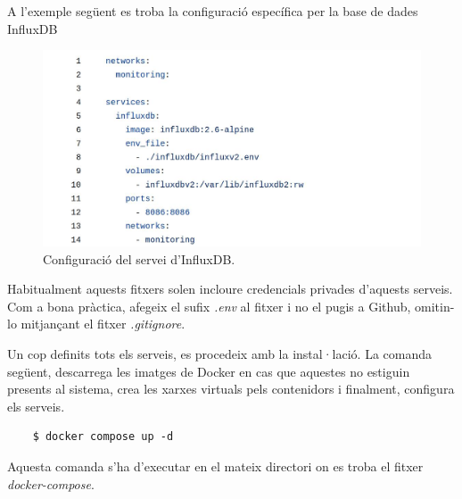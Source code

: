 \clearpage

\noindent
A l'exemple següent es troba la configuració específica per la base de dades InfluxDB

\begin{figure}[htbp]
    \centerline{\includegraphics[width=\textwidth]{figures/docker-compose-influxdb}}
    \captionsetup{justification=centering}
    \caption{Configuració del servei d'InfluxDB.}\label{fig:docker-compose-influxdb}
\end{figure}

\begin{tcolorbox}[colback=yellow!5!white, colframe=blue!75!black, title=Fitxers de configuració]
    Habitualment aquests fitxers solen incloure credencials privades d'aquests serveis.
    Com a bona pràctica, afegeix el sufix \textit{.env} al fitxer i no el pugis a Github, omitin-lo mitjançant el fitxer \textit{.gitignore}.
\end{tcolorbox}
\vspace{1em}

\noindent
Un cop definits tots els serveis, es procedeix amb la instal·lació.
La comanda següent, descarrega les imatges de Docker en cas que aquestes no estiguin presents al sistema,
crea les xarxes virtuals pels contenidors i finalment, configura els serveis.

\begin{verbatim}
    $ docker compose up -d
\end{verbatim}

\begin{tcolorbox}[colback=yellow!5!white, colframe=red!75!black, title=Atenció]
    Aquesta comanda s'ha d'executar en el mateix directori on es troba el fitxer \textit{docker-compose}.
\end{tcolorbox}

\clearpage

